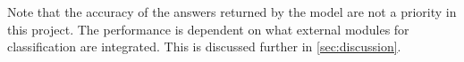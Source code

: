 Note that the accuracy of the answers returned by the model are not a priority in this project.
The performance is dependent on what external modules for classification are integrated.
This is discussed further in \autoref{sec:discussion}.



